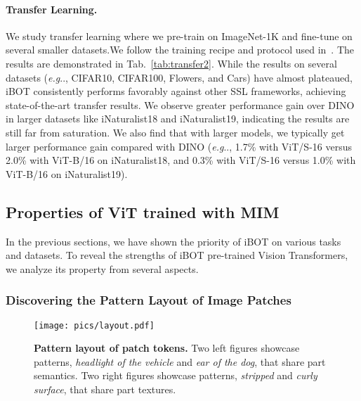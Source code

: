 \documentclass{article} \usepackage{iclr2022_conference,times}
\makeatletter
\def\ourmethod{{iBOT}\xspace}
\DeclareRobustCommand\onedot{\futurelet\@let@token\@onedot}
\def\@onedot{\ifx\@let@token.\else.\null\fi\xspace}
\def\eg{\emph{e.g}\onedot} \def\Eg{\emph{E.g}\onedot}
\makeatother
\begin{document}
\paragraph{Transfer Learning.}
We study transfer learning where we pre-train on ImageNet-1K and fine-tune on several smaller datasets.We follow the training recipe and protocol used in~\citep{vit}. 
The results are demonstrated in Tab.~\ref{tab:transfer2}. 
While the results on several datasets (\eg, CIFAR10, CIFAR100, Flowers, and Cars) have almost plateaued, \ourmethod consistently performs favorably against other SSL frameworks, achieving state-of-the-art transfer results. We observe greater performance gain over DINO in larger datasets like iNaturalist18 and iNaturalist19, indicating the results are still far from saturation. We also find that with larger models, we typically get larger performance gain compared with DINO (\eg, 1.7\% with ViT/S-16 versus 2.0\% with ViT-B/16 on iNaturalist18, and 0.3\% with ViT/S-16 versus 1.0\% with ViT-B/16 on iNaturalist19).


\subsection{Properties of ViT trained with MIM}
\label{sec:property}
In the previous sections, we have shown the priority of \ourmethod on various tasks and datasets. 
To reveal the strengths of \ourmethod pre-trained Vision Transformers, we analyze its property from several aspects.


\subsubsection{Discovering the Pattern Layout of Image Patches}
\label{sec:patchlayout}

\begin{figure}[!t]
\centering
\texttt{[image: pics/layout.pdf]}
\vspace{-0.5cm}
\caption{\textbf{Pattern layout of patch tokens.} 
Two left figures showcase patterns, \textit{headlight of the vehicle} and \textit{ear of the dog}, that share part semantics. 
Two right figures showcase patterns, \textit{stripped} and \textit{curly surface}, that share part textures.}
\vspace{-0.5cm}
\label{fig:layout}
\end{figure}
\end{document}
